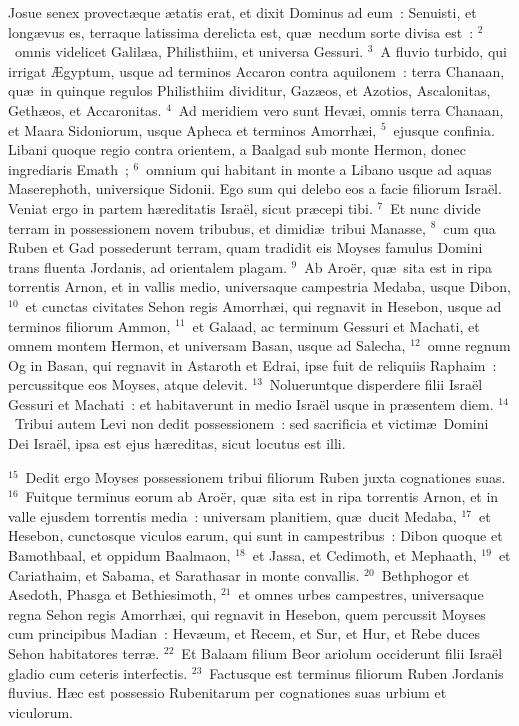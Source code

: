\lettrine[lines=3,image=true,loversize=0.05,lraise=-0.03]{J}{}osue senex provect\ae que \ae tatis erat, et dixit Dominus ad eum~: Senuisti, et long\ae vus es, terraque latissima derelicta est, qu\ae\ necdum sorte divisa est~:
${}^{2}$~omnis videlicet Galil\ae a, Philisthiim, et universa Gessuri.
${}^{3}$~A fluvio turbido, qui irrigat \AE gyptum, usque ad terminos Accaron contra aquilonem~: terra Chanaan, qu\ae\ in quinque regulos Philisthiim dividitur, Gaz\ae os, et Azotios, Ascalonitas, Geth\ae os, et Accaronitas.
${}^{4}$~Ad meridiem vero sunt Hev\ae i, omnis terra Chanaan, et Maara Sidoniorum, usque Apheca et terminos Amorrh\ae i,
${}^{5}$~ejusque confinia. Libani quoque regio contra orientem, a Baalgad sub monte Hermon, donec ingrediaris Emath~;
${}^{6}$~omnium qui habitant in monte a Libano usque ad aquas Maserephoth, universique Sidonii. Ego sum qui delebo eos a facie filiorum Isra\"el. Veniat ergo in partem h\ae reditatis Isra\"el, sicut pr\ae cepi tibi.
${}^{7}$~Et nunc divide terram in possessionem novem tribubus, et dimidi\ae\ tribui Manasse,
${}^{8}$~cum qua Ruben et Gad possederunt terram, quam tradidit eis Moyses famulus Domini trans fluenta Jordanis, ad orientalem plagam.
${}^{9}$~Ab Aro\"er, qu\ae\ sita est in ripa torrentis Arnon, et in vallis medio, universaque campestria Medaba, usque Dibon,
${}^{10}$~et cunctas civitates Sehon regis Amorrh\ae i, qui regnavit in Hesebon, usque ad terminos filiorum Ammon,
${}^{11}$~et Galaad, ac terminum Gessuri et Machati, et omnem montem Hermon, et universam Basan, usque ad Salecha,
${}^{12}$~omne regnum Og in Basan, qui regnavit in Astaroth et Edrai, ipse fuit de reliquiis Raphaim~: percussitque eos Moyses, atque delevit.
${}^{13}$~Nolueruntque disperdere filii Isra\"el Gessuri et Machati~: et habitaverunt in medio Isra\"el usque in pr\ae sentem diem.
${}^{14}$~Tribui autem Levi non dedit possessionem~: sed sacrificia et victim\ae\ Domini Dei Isra\"el, ipsa est ejus h\ae reditas, sicut locutus est illi.


${}^{15}$~Dedit ergo Moyses possessionem tribui filiorum Ruben juxta cognationes suas.
${}^{16}$~Fuitque terminus eorum ab Aro\"er, qu\ae\ sita est in ripa torrentis Arnon, et in valle ejusdem torrentis media~: universam planitiem, qu\ae\ ducit Medaba,
${}^{17}$~et Hesebon, cunctosque viculos earum, qui sunt in campestribus~: Dibon quoque et Bamothbaal, et oppidum Baalmaon,
${}^{18}$~et Jassa, et Cedimoth, et Mephaath,
${}^{19}$~et Cariathaim, et Sabama, et Sarathasar in monte convallis.
${}^{20}$~Bethphogor et Asedoth, Phasga et Bethiesimoth,
${}^{21}$~et omnes urbes campestres, universaque regna Sehon regis Amorrh\ae i, qui regnavit in Hesebon, quem percussit Moyses cum principibus Madian~: Hev\ae um, et Recem, et Sur, et Hur, et Rebe duces Sehon habitatores terr\ae .
${}^{22}$~Et Balaam filium Beor ariolum occiderunt filii Isra\"el gladio cum ceteris interfectis.
${}^{23}$~Factusque est terminus filiorum Ruben Jordanis fluvius. H\ae c est possessio Rubenitarum per cognationes suas urbium et viculorum.


